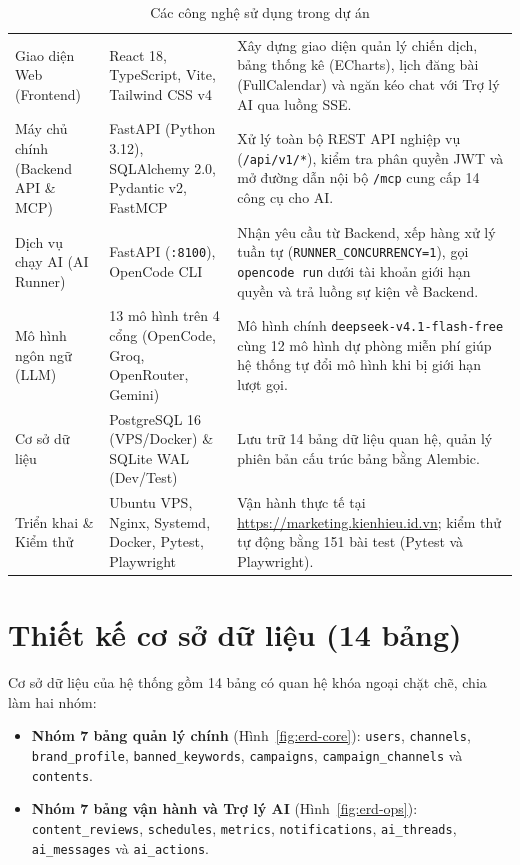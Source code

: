 \begin{table}[!htbp]
\centering
\footnotesize
\renewcommand{\arraystretch}{1.05}
\caption{Các công nghệ sử dụng trong dự án}
\label{tab:tech-stack}
\begin{tabularx}{\textwidth}{|L{2.8cm}|L{3.4cm}|Y|}
\hline
{} &  & \\
\hline
Giao diện Web (Frontend) & React 18, TypeScript, Vite, Tailwind CSS v4 & Xây dựng giao diện quản lý chiến dịch, bảng thống kê (ECharts), lịch đăng bài (FullCalendar) và ngăn kéo chat với Trợ lý AI qua luồng SSE.\\
\hline
Máy chủ chính (Backend API \& MCP) & FastAPI (Python 3.12), SQLAlchemy 2.0, Pydantic v2, FastMCP & Xử lý toàn bộ REST API nghiệp vụ (\texttt{/api/v1/*}), kiểm tra phân quyền JWT và mở đường dẫn nội bộ \texttt{/mcp} cung cấp 14 công cụ cho AI.\\
\hline
Dịch vụ chạy AI (AI Runner) & FastAPI (\texttt{:8100}), OpenCode CLI & Nhận yêu cầu từ Backend, xếp hàng xử lý tuần tự (\texttt{RUNNER\_CONCURRENCY=1}), gọi \texttt{opencode run} dưới tài khoản giới hạn quyền và trả luồng sự kiện về Backend.\\
\hline
Mô hình ngôn ngữ (LLM) & 13 mô hình trên 4 cổng (OpenCode, Groq, OpenRouter, Gemini) & Mô hình chính \texttt{deepseek-v4.1-flash-free} cùng 12 mô hình dự phòng miễn phí giúp hệ thống tự đổi mô hình khi bị giới hạn lượt gọi.\\
\hline
Cơ sở dữ liệu & PostgreSQL 16 (VPS/Docker) \& SQLite WAL (Dev/Test) & Lưu trữ 14 bảng dữ liệu quan hệ, quản lý phiên bản cấu trúc bảng bằng Alembic.\\
\hline
Triển khai \& Kiểm thử & Ubuntu VPS, Nginx, Systemd, Docker, Pytest, Playwright & Vận hành thực tế tại \url{https://marketing.kienhieu.id.vn}; kiểm thử tự động bằng 151 bài test (Pytest và Playwright).\\
\hline
\end{tabularx}
\end{table}

\section{Thiết kế cơ sở dữ liệu (14 bảng)}

Cơ sở dữ liệu của hệ thống gồm 14 bảng có quan hệ khóa ngoại chặt chẽ, chia làm hai nhóm:
\begin{itemize}[noitemsep,topsep=2pt]
 \item \textbf{Nhóm 7 bảng quản lý chính} (Hình~\ref{fig:erd-core}): \texttt{users}, \texttt{channels}, \texttt{brand\_profile}, \texttt{banned\_keywords}, \texttt{campaigns}, \texttt{campaign\_channels} và \texttt{contents}.
 \item \textbf{Nhóm 7 bảng vận hành và Trợ lý AI} (Hình~\ref{fig:erd-ops}): \texttt{content\_reviews}, \texttt{schedules}, \texttt{metrics}, \texttt{notifications}, \texttt{ai\_threads}, \texttt{ai\_messages} và \texttt{ai\_actions}.
\end{itemize}

